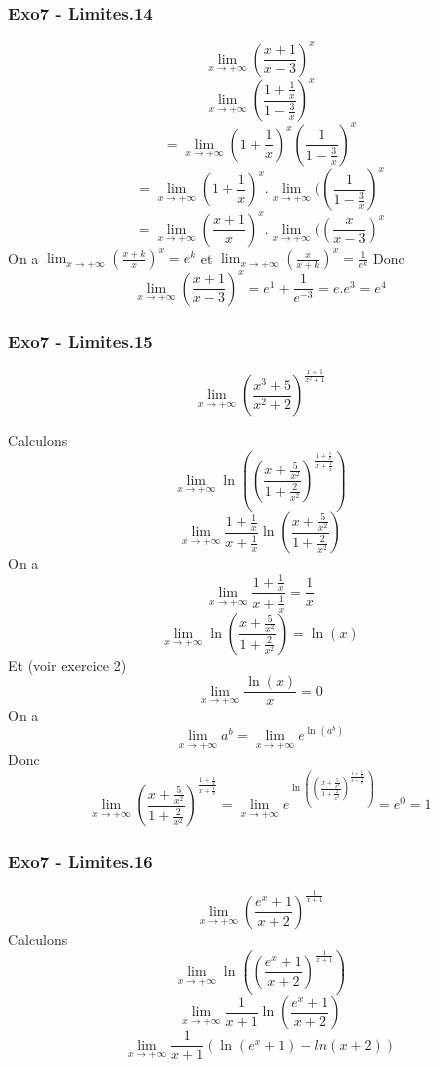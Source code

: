 \documentclass[]{book}
\theoremstyle{definition}
\begin{document}
\subsubsection*{Exo7 - Limites.14}
$$\lim_{x \to +\infty}\left(\frac{x+1}{x-3}\right)^x$$
$$\lim_{x \to +\infty}\left(\frac{1+\frac{1}{x}}{1-\frac{3}{x}}\right)^x$$
$$= \lim_{x \to +\infty}(1+\frac{1}{x})^x\left(\frac{1}{1-\frac{3}{x}}\right)^x$$
$$= \lim_{x \to +\infty}(1+\frac{1}{x})^x . \lim_{x \to +\infty}(\left(\frac{1}{1-\frac{3}{x}}\right)^x$$
$$= \lim_{x \to +\infty}\left(\frac{x+1}{x}\right)^x . \lim_{x \to +\infty}(\left(\frac{x}{x-3}\right)^x$$
On a $\lim_{x \to +\infty}\left(\frac{x+k}{x}\right)^x = {e^k}$ et $\lim_{x \to +\infty}\left(\frac{x}{x+k}\right)^x = \frac{1}{e^k}$ 
Donc
$$\lim_{x \to +\infty}\left(\frac{x+1}{x-3}\right)^x = e^1 + \frac{1}{e^{-3}} = e.e^3= e^4$$


\subsubsection*{Exo7 - Limites.15}
$$\lim_{x \to +\infty}\left(\frac{x^3+5}{x^2+2}\right)^{\frac{x+1}{x^2+1}}$$

Calculons 
$$\lim_{x \to +\infty}\ln\left(\left(\frac{x+\frac{5}{x^2}}{1+\frac{2}{x^2}}\right)^{\frac{1+\frac{1}{x}}{x+\frac{1}{x}}}\right)$$
$$\lim_{x \to +\infty} \frac{1+\frac{1}{x}}{x+\frac{1}{x}} \ln\left(\frac{x+\frac{5}{x^2}}{1+\frac{2}{x^2}}\right)$$
On a 
$$\lim_{x \to +\infty} \frac{1+\frac{1}{x}}{x+\frac{1}{x}} = \frac{1}{x}$$
$$\lim_{x \to +\infty} \ln\left(\frac{x+\frac{5}{x^2}}{1+\frac{2}{x^2}}\right) = \ln(x)$$
Et (voir exercice 2)
$$\lim_{x \to +\infty} \frac{\ln(x)}{x} = 0$$
On a 
$$\lim_{x \to +\infty} a^b = \lim_{x \to +\infty} e^{\ln(a^b)}$$
Donc
$$\lim_{x \to +\infty} \left(\frac{x+\frac{5}{x^2}}{1+\frac{2}{x^2}}\right)^{\frac{1+\frac{1}{x}}{x+\frac{1}{x}}} = \lim_{x \to +\infty}e^{\ln\left(\left(\frac{x+\frac{5}{x^2}}{1+\frac{2}{x^2}}\right)^{\frac{1+\frac{1}{x}}{x+\frac{1}{x}}}\right)} = e^0 = 1$$


\subsubsection*{Exo7 - Limites.16}
$$\lim_{x \to +\infty} \left(\frac{e^x+1}{x+2}\right)^{\frac{1}{x+1}}$$
Calculons 
$$\lim_{x \to +\infty}\ln\left(\left(\frac{e^x+1}{x+2}\right)^{\frac{1}{x+1}}\right)$$
$$\lim_{x \to +\infty}\frac{1}{x+1} \ln\left(\frac{e^x+1}{x+2}\right)$$
$$\lim_{x \to +\infty}\frac{1}{x+1} (\ln(e^x+1)- ln(x+2))$$
\end{document}
